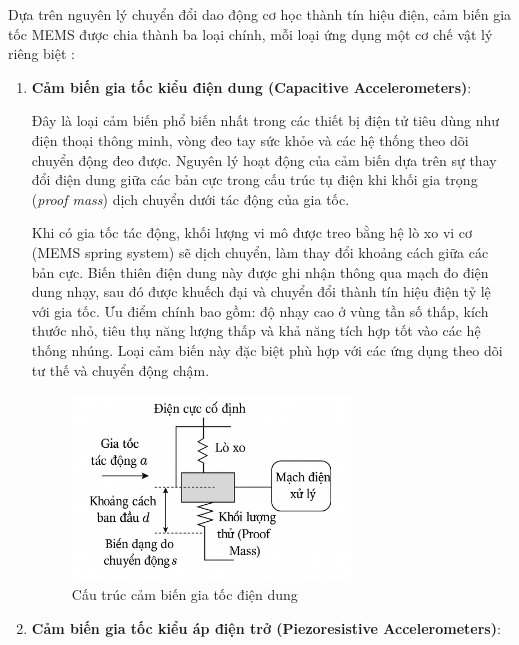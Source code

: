 Dựa trên nguyên lý chuyển đổi dao động cơ học thành tín hiệu điện, cảm biến gia
tốc MEMS được chia thành ba loại chính, mỗi loại ứng dụng một cơ chế vật lý
riêng biệt \cite{Acce, cambien}:

\begin{enumerate}
  \item \textbf{Cảm biến gia tốc kiểu điện dung (Capacitive Accelerometers)}:

        Đây là loại cảm biến phổ biến nhất trong các thiết bị điện tử tiêu dùng như điện thoại thông minh, vòng đeo tay sức khỏe và các hệ thống theo dõi chuyển động đeo được. Nguyên lý hoạt động của cảm biến dựa trên sự thay đổi điện dung giữa các bản cực trong cấu trúc tụ điện khi khối gia trọng (\textit{proof mass}) dịch chuyển dưới tác động của gia tốc.

        Khi có gia tốc tác động, khối lượng vi mô được treo bằng hệ lò xo vi cơ (MEMS
        spring system) sẽ dịch chuyển, làm thay đổi khoảng cách giữa các bản cực. Biến
        thiên điện dung này được ghi nhận thông qua mạch đo điện dung nhạy, sau đó được
        khuếch đại và chuyển đổi thành tín hiệu điện tỷ lệ với gia tốc. Ưu điểm chính
        bao gồm: độ nhạy cao ở vùng tần số thấp, kích thước nhỏ, tiêu thụ năng lượng
        thấp và khả năng tích hợp tốt vào các hệ thống nhúng. Loại cảm biến này đặc
        biệt phù hợp với các ứng dụng theo dõi tư thế và chuyển động chậm.

        \begin{figure}[H]
          \centering
          \includegraphics[width=0.7\textwidth]{images/diendung.png}
          \vspace*{-7mm}
          \caption{Cấu trúc cảm biến gia tốc điện dung}
          \label{acce_mems}
        \end{figure}

  \item \textbf{Cảm biến gia tốc kiểu áp điện trở (Piezoresistive Accelerometers)}:


\end{enumerate}
